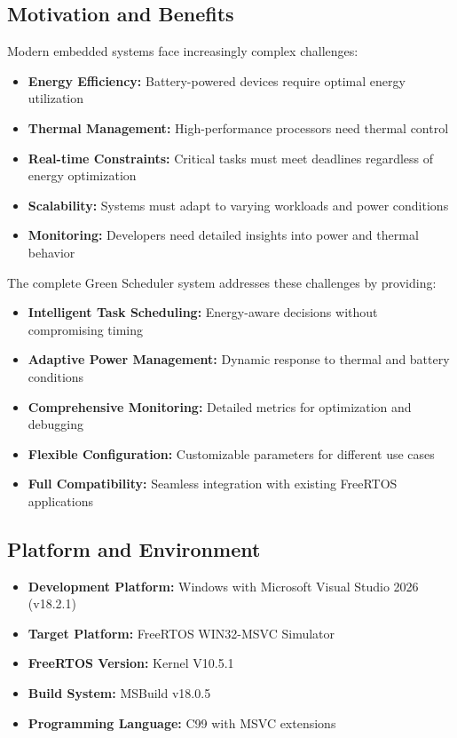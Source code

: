 \documentclass[11pt,a4paper]{article}
\begin{document}
\subsection{Motivation and Benefits}
Modern embedded systems face increasingly complex challenges:
\begin{itemize}
    \item \textbf{Energy Efficiency:} Battery-powered devices require optimal energy utilization
    \item \textbf{Thermal Management:} High-performance processors need thermal control
    \item \textbf{Real-time Constraints:} Critical tasks must meet deadlines regardless of energy optimization
    \item \textbf{Scalability:} Systems must adapt to varying workloads and power conditions
    \item \textbf{Monitoring:} Developers need detailed insights into power and thermal behavior
\end{itemize}

The complete Green Scheduler system addresses these challenges by providing:
\begin{itemize}
    \item \textbf{Intelligent Task Scheduling:} Energy-aware decisions without compromising timing
    \item \textbf{Adaptive Power Management:} Dynamic response to thermal and battery conditions
    \item \textbf{Comprehensive Monitoring:} Detailed metrics for optimization and debugging
    \item \textbf{Flexible Configuration:} Customizable parameters for different use cases
    \item \textbf{Full Compatibility:} Seamless integration with existing FreeRTOS applications
\end{itemize}

\subsection{Platform and Environment}
\begin{itemize}
    \item \textbf{Development Platform:} Windows with Microsoft Visual Studio 2026 (v18.2.1)
    \item \textbf{Target Platform:} FreeRTOS WIN32-MSVC Simulator
    \item \textbf{FreeRTOS Version:} Kernel V10.5.1
    \item \textbf{Build System:} MSBuild v18.0.5
    \item \textbf{Programming Language:} C99 with MSVC extensions
\end{itemize}
\end{document}
